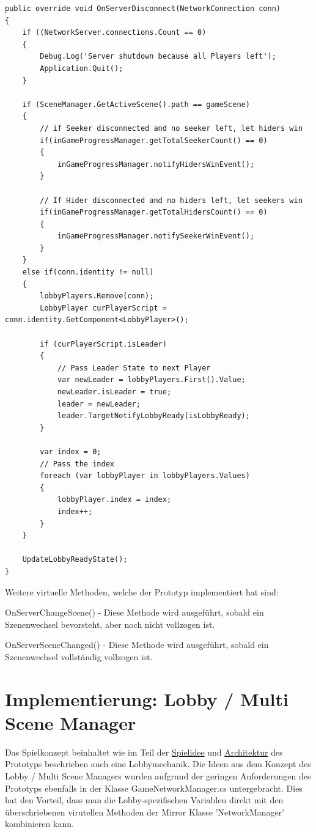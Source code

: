 \begin{lstlisting}[caption= GameNetworkManager.cs OnServerDisconnect()]
public override void OnServerDisconnect(NetworkConnection conn)
{
	if ((NetworkServer.connections.Count == 0)
	{
		Debug.Log('Server shutdown because all Players left');
		Application.Quit();
	}

	if (SceneManager.GetActiveScene().path == gameScene)
	{
		// if Seeker disconnected and no seeker left, let hiders win
		if(inGameProgressManager.getTotalSeekerCount() == 0)
		{
			inGameProgressManager.notifyHidersWinEvent();
		}
		
		// If Hider disconnected and no hiders left, let seekers win
		if(inGameProgressManager.getTotalHidersCount() == 0)
		{
			inGameProgressManager.notifySeekerWinEvent();
		}
	}
	else if(conn.identity != null)
	{
		lobbyPlayers.Remove(conn);
		LobbyPlayer curPlayerScript = conn.identity.GetComponent<LobbyPlayer>();
			
		if (curPlayerScript.isLeader)
		{
			// Pass Leader State to next Player
			var newLeader = lobbyPlayers.First().Value;
			newLeader.isLeader = true;
			leader = newLeader;
			leader.TargetNotifyLobbyReady(isLobbyReady);
		}
			
		var index = 0;
		// Pass the index
		foreach (var lobbyPlayer in lobbyPlayers.Values)
		{
			lobbyPlayer.index = index;
			index++;
		}
	}
		
	UpdateLobbyReadyState();
}
\end{lstlisting}

Weitere virtuelle Methoden, welche der Prototyp implementiert hat sind:

OnServerChangeScene() - Diese Methode wird ausgeführt, sobald ein Szenenwechsel bevorsteht, aber noch nicht vollzogen ist.

OnServerSceneChanged() - Diese Methode wird ausgeführt, sobald ein Szenenwechsel vollständig vollzogen ist.

\section{Implementierung: Lobby / Multi Scene Manager}
\label{Lobby Manager Implementierung}

Das Spielkonzept beinhaltet wie im Teil der \hyperref[Spielidee]{Spielidee} und \hyperref[Architektur]{Architektur} des Prototyps beschrieben auch eine Lobbymechanik. Die Ideen aus dem Konzept des Lobby / Multi Scene Managers wurden aufgrund der geringen Anforderungen des Prototyps ebenfalls in der Klasse GameNetworkManager.cs untergebracht. Dies hat den Vorteil, dass man die Lobby-spezifischen Variablen direkt mit den überschriebenen virutellen Methoden der Mirror Klasse 'NetworkManager' kombinieren kann.

